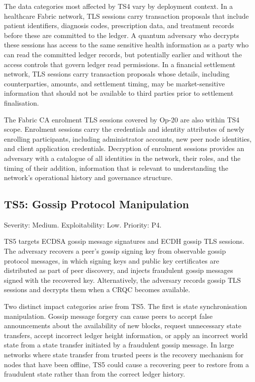 \documentclass[conference]{IEEEtran}
\begin{document}
The data categories most affected by TS4 vary by deployment context.
In a healthcare Fabric network, TLS sessions carry transaction proposals
that include patient identifiers, diagnosis codes, prescription data, and
treatment records before these are committed to the ledger. A quantum
adversary who decrypts these sessions has access to the same sensitive
health information as a party who can read the committed ledger records,
but potentially earlier and without the access controls that govern ledger
read permissions. In a financial settlement network, TLS sessions carry
transaction proposals whose details, including counterparties, amounts,
and settlement timing, may be market-sensitive information that should
not be available to third parties prior to settlement finalisation.

The Fabric CA enrolment TLS sessions covered by Op-20 are also within
TS4 scope. Enrolment sessions carry the credentials and identity
attributes of newly enrolling participants, including administrator
accounts, new peer node identities, and client application credentials.
Decryption of enrolment sessions provides an adversary with a catalogue
of all identities in the network, their roles, and the timing of their
addition, information that is relevant to understanding the network's
operational history and governance structure.

\subsection{TS5: Gossip Protocol Manipulation}

Severity: Medium. Exploitability: Low. Priority: P4.

TS5 targets ECDSA gossip message signatures and ECDH gossip TLS sessions.
The adversary recovers a peer's gossip signing key from observable gossip
protocol messages, in which signing keys and public key certificates are
distributed as part of peer discovery, and injects fraudulent gossip
messages signed with the recovered key. Alternatively, the adversary
records gossip TLS sessions and decrypts them when a CRQC becomes
available.

Two distinct impact categories arise from TS5. The first is state
synchronisation manipulation. Gossip message forgery can cause peers to
accept false announcements about the availability of new blocks, request
unnecessary state transfers, accept incorrect ledger height information,
or apply an incorrect world state from a state transfer initiated by a
fraudulent gossip message. In large networks where state transfer from
trusted peers is the recovery mechanism for nodes that have been offline,
TS5 could cause a recovering peer to restore from a fraudulent state
rather than from the correct ledger history.
\end{document}
